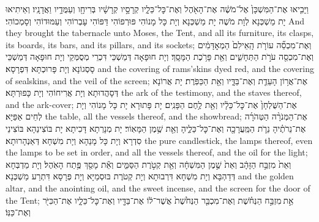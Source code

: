 {%
{וַיָּבִ֤יאוּ אֶת־הַמִּשְׁכָּן֙ אֶל־מֹשֶׁ֔ה אֶת־הָאֹ֖הֶל וְאֶת־כׇּל־כֵּלָ֑יו קְרָסָ֣יו קְרָשָׁ֔יו בְּרִיחָ֖ו וְעַמֻּדָ֥יו וַאֲדָנָֽיו׃
}
{וְאֵיתִיאוּ יָת מַשְׁכְּנָא לְוָת מֹשֶׁה יָת מַשְׁכְּנָא וְיָת כָּל מָנוֹהִי פּוּרְפוֹהִי דַּפּוֹהִי עָבְרוֹהִי וְעַמּוּדוֹהִי וְסָמְכוֹהִי׃}
{And they brought the tabernacle unto Moses, the Tent, and all its furniture, its clasps, its boards, its bars, and its pillars, and its sockets;}{}
{וְאֶת־מִכְסֵ֞ה עוֹרֹ֤ת הָֽאֵילִם֙ הַמְאׇדָּמִ֔ים וְאֶת־מִכְסֵ֖ה עֹרֹ֣ת הַתְּחָשִׁ֑ים וְאֵ֖ת פָּרֹ֥כֶת הַמָּסָֽךְ׃}
{וְיָת חוּפָאָה דְּמַשְׁכֵּי דִּכְרֵי מְסֻמְּקֵי וְיָת חוּפָאָה דְּמַשְׁכֵּי סָסְגוֹנָא וְיָת פָּרוּכְתָּא דִּפְרָסָא׃}
{and the covering of rams’skins dyed red, and the covering of sealskins, and the veil of the screen;}{}
{אֶת־אֲר֥וֹן הָעֵדֻ֖ת וְאֶת־בַּדָּ֑יו וְאֵ֖ת הַכַּפֹּֽרֶת׃}
{יָת אֲרוֹנָא דְּסָהֲדוּתָא וְיָת אֲרִיחוֹהִי וְיָת כָּפוּרְתָּא׃}
{the ark of the testimony, and the staves thereof, and the ark-cover;}{}
{אֶת־הַשֻּׁלְחָן֙ אֶת־כׇּל־כֵּלָ֔יו וְאֵ֖ת לֶ֥חֶם הַפָּנִֽים׃}
{יָת פָּתוּרָא יָת כָּל מָנוֹהִי וְיָת לְחֵים אַפַּיָּא׃}
{the table, all the vessels thereof, and the showbread;}{}
{אֶת־הַמְּנֹרָ֨ה הַטְּהֹרָ֜ה אֶת־נֵרֹתֶ֗יהָ נֵרֹ֛ת הַמַּֽעֲרָכָ֖ה וְאֶת־כׇּל־כֵּלֶ֑יהָ וְאֵ֖ת שֶׁ֥מֶן הַמָּאֽוֹר׃}
{יָת מְנָרְתָא דָּכִיתָא יָת בּוֹצִינַהָא בּוֹצִינֵי סִדְרָא וְיָת כָּל מָנַהָא וְיָת מִשְׁחָא דְּאַנְהָרוּתָא׃}
{the pure candlestick, the lamps thereof, even the lamps to be set in order, and all the vessels thereof, and the oil for the light;}{}
{וְאֵת֙ מִזְבַּ֣ח הַזָּהָ֔ב וְאֵת֙ שֶׁ֣מֶן הַמִּשְׁחָ֔ה וְאֵ֖ת קְטֹ֣רֶת הַסַּמִּ֑ים וְאֵ֕ת מָסַ֖ךְ פֶּ֥תַח הָאֹֽהֶל׃}
{וְיָת מַדְבְּחָא דְּדַהְבָּא וְיָת מִשְׁחָא דִּרְבוּתָא וְיָת קְטֹרֶת בּוּסְמַיָּא וְיָת פְּרָסָא דִּתְרַע מַשְׁכְּנָא׃}
{and the golden altar, and the anointing oil, and the sweet incense, and the screen for the door of the Tent;}{}
{אֵ֣ת \legarmeh  מִזְבַּ֣ח הַנְּחֹ֗שֶׁת וְאֶת־מִכְבַּ֤ר הַנְּחֹ֙שֶׁת֙ אֲשֶׁר־ל֔וֹ אֶת־בַּדָּ֖יו וְאֶת־כׇּל־כֵּלָ֑יו אֶת־הַכִּיֹּ֖ר וְאֶת־כַּנּֽוֹ׃}
}
